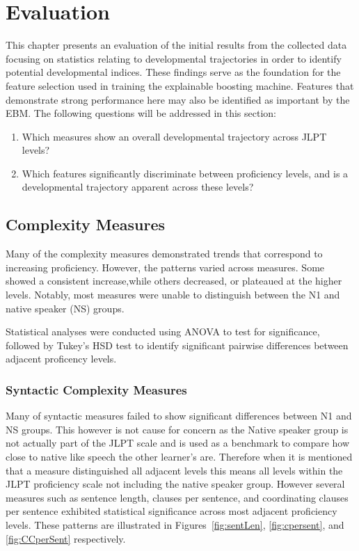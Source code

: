 \chapter{Evaluation} 
This chapter presents an evaluation of the initial results from the collected data focusing on statistics relating to
developmental trajectories in order to identify potential developmental indices. These findings serve as the
foundation
for the feature selection used in training the explainable boosting machine. Features that demonstrate strong
performance here may also be identified as important by the EBM. The following questions will be addressed in this
section:

\begin{enumerate}
    \item Which measures show an overall developmental trajectory across JLPT levels?
    \item Which features significantly discriminate between proficiency levels, and is a developmental trajectory
    apparent across these levels?
\end{enumerate}

\section{Complexity Measures}

Many of the complexity measures demonstrated trends that correspond to increasing proficiency. However, the patterns
varied across measures. Some showed a consistent increase,while others
decreased, or plateaued at the
higher levels. Notably, most measures were unable to distinguish between the N1 and native speaker (NS) groups.

Statistical analyses were conducted using ANOVA to test for significance, followed by Tukey's HSD test to identify
significant pairwise differences between adjacent proficency levels.

\subsection{Syntactic Complexity Measures}


Many of syntactic measures failed to show significant differences between N1 and NS groups. This however is not
cause for concern as the Native speaker group is not actually part of the JLPT scale and is used as a benchmark to
compare how close to native like speech the other learner's are. Therefore when it is mentioned that a measure
distinguished all adjacent levels this means all levels within the JLPT proficiency scale not including the native
speaker group.
However several measures
such as sentence length, clauses per sentence, and coordinating clauses per sentence exhibited statistical significance
across most
adjacent proficiency levels. These patterns are illustrated in Figures~\ref{fig:sentLen}, \ref{fig:cpersent}, and \ref{fig:CCperSent} respectively.

